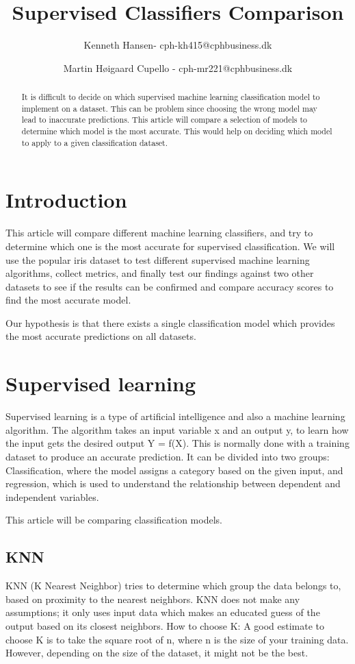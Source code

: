 \documentclass{article}
\author{Kenneth Hansen- cph-kh415@cphbusiness.dk
    \and Martin Høigaard Cupello - cph-mr221@cphbusiness.dk}
\title{Supervised Classifiers Comparison}
\begin{document}
\maketitle
\thispagestyle{empty}

\begin{abstract}
  \noindent It is difficult to decide on which supervised machine learning classification model to implement on a dataset.
  This can be problem since choosing the wrong model may lead to inaccurate predictions.
  This article will compare a selection of models to determine which model is the most accurate.
  This would help on deciding which model to apply to a given classification dataset.
\end{abstract}
\tableofcontents
\clearpage



\section{Introduction}
This article will compare different machine learning classifiers, and try to determine which one is the most accurate for supervised classification. We will use the popular iris dataset to test different supervised machine learning algorithms, collect metrics, and finally test our findings against two other datasets to see if the results can be confirmed and compare accuracy scores to find the most accurate model.

\bigskip

\noindent Our hypothesis is that there exists a single classification model which provides the most accurate predictions on all datasets.

\section{Supervised learning}
Supervised learning is a type of artificial intelligence and also a machine learning algorithm. The algorithm takes an input variable x and an output y, to learn how the input gets the desired output Y = f(X). This is normally done with a training dataset to produce an accurate prediction. It can be divided into two groups: Classification, where the model assigns a category based on the given input,  and regression, which is used to understand the relationship between dependent and independent variables.

This article will be comparing classification models.

\subsection{KNN}
KNN (K Nearest Neighbor) tries to determine which group the data belongs to, based on proximity to the nearest neighbors.
KNN does not make any assumptions; it only uses input data which makes an educated guess of the output based on its closest neighbors.
How to choose K:
A good estimate to choose K is to take the square root of n, where n is the size of your training data. However, depending on the size of the dataset, it might not be the best.
\end{document}
